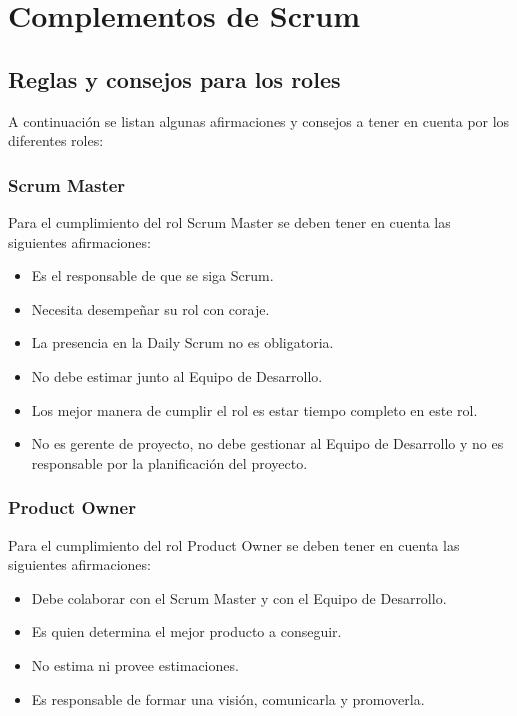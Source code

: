 \chapter{Complementos de Scrum}

\section{Reglas y consejos para los roles}

A continuación se listan algunas afirmaciones y consejos a tener en cuenta por los diferentes roles:

\subsection{Scrum Master}

Para el cumplimiento del rol Scrum Master se deben tener en cuenta las siguientes afirmaciones:

\begin{itemize}
\item Es el responsable de que se siga Scrum.
\item Necesita desempeñar su rol con coraje.
\item La presencia en la Daily Scrum no es obligatoria.
\item No debe estimar junto al Equipo de Desarrollo.
\item Los mejor manera de cumplir el rol es estar tiempo completo en este rol.
\item No es gerente de proyecto, no debe gestionar al Equipo de Desarrollo y no es responsable por la planificación del proyecto.
\end{itemize}

\subsection{Product Owner}

Para el cumplimiento del rol Product Owner se deben tener en cuenta las siguientes afirmaciones:

\begin{itemize}
\item Debe colaborar con el Scrum Master y con el Equipo de Desarrollo.
\item Es quien determina el mejor producto a conseguir.
\item No estima ni provee estimaciones.
\item Es responsable de formar una visión, comunicarla y promoverla.
\end{itemize}

